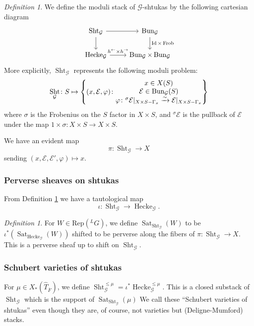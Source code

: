 \documentclass[reqno]{amsart}
\numberwithin{equation}{section}
\newcommand{\ol}[1]{\overline{#1}}
\newcommand{\wh}[1]{\widehat{#1}}
\newcommand{\Cal}[1]{\mathcal{#1}}
\newcommand{\co}{\colon}
\newcommand{\mrm}[1]{\mathrm{#1}}
\DeclareMathOperator{\Frob}{Frob}
\DeclareMathOperator{\Bun}{Bun}
\DeclareMathOperator{\Id}{Id}
\DeclareMathOperator{\Sht}{Sht}
\DeclareMathOperator{\Hecke}{Hecke}
\DeclareMathOperator{\Sat}{Sat}
\theoremstyle{remark}
\newtheorem{defn}[thm]{Definition}
\numberwithin{equation}{section}
\begin{document}
\begin{defn}\label{def: shtukas}
We define the moduli stack of $\Cal{G}$-shtukas by the following cartesian diagram 
\[
\begin{tikzcd}
\Sht_{\Cal{G}} \ar[r]   \ar[d] & \Bun_{\Cal{G}}  \ar[d, "\Id \times \Frob"] \\
\Hecke_{\Cal{G}} \ar[r, "h^{\leftarrow} \times h^{\rightarrow}"] & \Bun_{\Cal{G}}  \times \Bun_{\Cal{G}}
\end{tikzcd}
\]
More explicitly, $\Sht_{\Cal{G}}$ represents the following moduli problem:
\[
\Sht_{\Cal{G}} \co S \mapsto \left\{ (x, \Cal{E} , \varphi) \colon  \begin{array}{@{}c@{}} 
x \in X(S) \\
  \Cal{E}\in \Bun_{\Cal{G}}(S)  \\
\varphi \colon {}^{\sigma} \Cal{E}|_{X \times S - \Gamma_{x}} \xrightarrow{\sim} \Cal{E}|_{X \times S - \Gamma_{x}}
 \end{array} \right\}  
\]
where $\sigma$ is the Frobenius on the $S$ factor in $X \times  S$, and  ${}^{\sigma} \Cal{E}$ is the pullback of $\Cal{E}$ under the map $1 \times \sigma \co X \times S \rightarrow X \times S$. 
	\end{defn}
	
	We have an evident map 
	\[
	\pi \co \Sht_{\Cal{G}} \rightarrow X
	\]
	sending $(x, \Cal{E}, \Cal{E}',  \varphi)  \mapsto x$.
	
	



\subsubsection{Perverse sheaves on shtukas}  From Definition \ref{def: shtukas} we have a tautological map 
\[
\iota \co \Sht_{\Cal{G}}  \rightarrow \Hecke_{\Cal{G}} .
\] 

\begin{defn}
For $W \in \mrm{Rep}({}^L G)$, we define $\Sat_{\Sht_{\Cal{G}}}(W)$ to be $\iota^*(\Sat_{\Hecke_{\Cal{G}}}(W))$ shifted to be perverse along the fibers of $\pi \co  \Sht_{\Cal{G}} \rightarrow X$. This is a perverse sheaf up to shift on $\Sht_{\Cal{G}}$. 
\end{defn}


	\subsubsection{Schubert varieties of shtukas} 
	
For $\mu \in X_*(\wh{T}_{\ol{F}})$, we define $\Sht_{\Cal{G}}^{\leq \mu} = \iota^*  \Hecke_{\Cal{G}}^{\leq\mu}$. This is a closed substack  of $\Sht_{\Cal{G}}$ which is the support of $\Sat_{\Sht_{\Cal{G}}}(\mu)$ We call these ``Schubert varieties of shtukas'' even though they are, of course, not varieties but (Deligne-Mumford) stacks.
\end{document}
